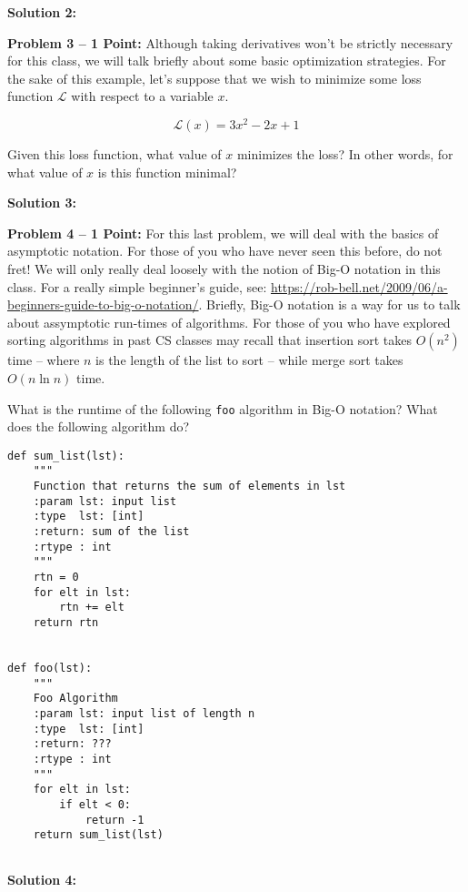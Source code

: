 \documentclass[]{article}
\begin{document}
\textbf{Solution 2:}

\clearpage
\textbf{Problem 3 -- 1 Point:}
Although taking derivatives won't be strictly necessary for this class, we will talk briefly about some basic optimization strategies.  For the sake of this example, let's suppose that we wish to minimize some loss function $\mathcal{L}$ with respect to a variable $x$.  

$$\mathcal{L}(x) = 3x^2 - 2x + 1$$

Given this loss function, what value of $x$ minimizes the loss?  In other words, for what value of $x$ is this function minimal?

\textbf{Solution 3:}

\clearpage
\textbf{Problem 4 -- 1 Point:}
For this last problem, we will deal with the basics of asymptotic notation.  For those of you who have never seen this before, do not fret!  We will only really deal loosely with the notion of Big-O notation in this class.  For a really simple beginner's guide, see: \url{https://rob-bell.net/2009/06/a-beginners-guide-to-big-o-notation/}. Briefly, Big-O notation is a way for us to talk about assymptotic run-times of algorithms. For those of you who have explored sorting algorithms in past CS classes may recall that insertion sort takes $O(n^2)$ time -- where $n$ is the length of the list to sort -- while merge sort takes $O(n\ln n)$ time.

What is the runtime of the following \texttt{foo} algorithm in Big-O notation?  What does the following algorithm do?

\begin{lstlisting}
def sum_list(lst):
    """
    Function that returns the sum of elements in lst
    :param lst: input list
    :type  lst: [int]
    :return: sum of the list
    :rtype : int
    """
    rtn = 0
    for elt in lst:
        rtn += elt
    return rtn


def foo(lst):
    """
    Foo Algorithm
    :param lst: input list of length n
    :type  lst: [int]
    :return: ???
    :rtype : int
    """
    for elt in lst:
        if elt < 0:
            return -1
    return sum_list(lst)
        

\end{lstlisting}

\textbf{Solution 4:}
\end{document}
